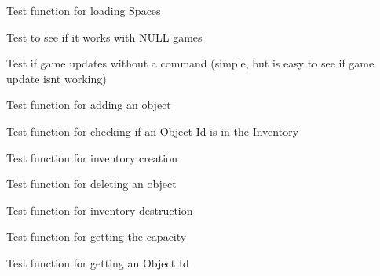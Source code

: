 \begin{DoxyRefList}
\item[\label{test__test000012}%
\hypertarget{test__test000012}{}%
Member \hyperlink{game__reader__test_8h_a1bf200d01046a242ee3379e62545fa01}{test2\+\_\+game\+\_\+reader\+\_\+load\+\_\+spaces} ()]Test function for loading Spaces  
\item[\label{test__test000074}%
\hypertarget{test__test000074}{}%
Member \hyperlink{game__test_8h_a2bee8c4494438aa5cdc301ca6ef40e88}{test2\+\_\+game\+\_\+set\+\_\+object\+\_\+location} ()]Test to see if it works with N\+U\+LL games  
\item[\label{test__test000033}%
\hypertarget{test__test000033}{}%
Member \hyperlink{game__test_8h_aa7c7e1467a24f4d1086096b73a38739e}{test2\+\_\+game\+\_\+update} ()]Test if game updates without a command (simple, but is easy to see if game update isnt working)  
\item[\label{test__test000094}%
\hypertarget{test__test000094}{}%
Member \hyperlink{inventory__test_8h_a48019cb45cb5918233d5d42334d2be17}{test2\+\_\+inventory\+\_\+add} ()]Test function for adding an object  
\item[\label{test__test000115}%
\hypertarget{test__test000115}{}%
Member \hyperlink{inventory__test_8h_a847aa346d12ebb77d86d202bd0fa99b6}{test2\+\_\+inventory\+\_\+check\+\_\+object} ()]Test function for checking if an Object Id is in the Inventory  
\item[\label{test__test000090}%
\hypertarget{test__test000090}{}%
Member \hyperlink{inventory__test_8h_a73a6080c360a8870c4ffc734e989c8b3}{test2\+\_\+inventory\+\_\+create} ()]Test function for inventory creation  
\item[\label{test__test000098}%
\hypertarget{test__test000098}{}%
Member \hyperlink{inventory__test_8h_a242baf98676c3685d4696ec6c006cbb9}{test2\+\_\+inventory\+\_\+del} ()]Test function for deleting an object  
\item[\label{test__test000092}%
\hypertarget{test__test000092}{}%
Member \hyperlink{inventory__test_8h_a9f3daec28c696c0671e6a3e905359741}{test2\+\_\+inventory\+\_\+destroy} ()]Test function for inventory destruction  
\item[\label{test__test000112}%
\hypertarget{test__test000112}{}%
Member \hyperlink{inventory__test_8h_ac75954611acab583f780145532ab3197}{test2\+\_\+inventory\+\_\+get\+\_\+max\+\_\+objects} ()]Test function for getting the capacity  
\item[\label{test__test000106}%
\hypertarget{test__test000106}{}%
Member \hyperlink{inventory__test_8h_a41ba2562e1c60e222110f05c9a8e221e}{test2\+\_\+inventory\+\_\+get\+\_\+object\+\_\+id} ()]Test function for getting an Object Id  

\end{DoxyRefList}
